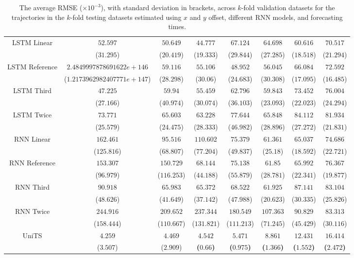 \begin{table}[!ht]
{\begin{tabular}{|c|c|c|c|c|c|c|c|}
			\multirow{2}{*}{LSTM Linear} & $52.597$ & $50.649$ & $44.777$ & $67.124$ & $64.698$ & $60.616$ & $70.517$ \\
			 & ($31.295$) & ($20.419$) & ($19.333$) & ($29.844$) & ($27.285$) & ($18.518$) & ($21.294$) \\ \hline
			\multirow{2}{*}{LSTM Reference} & $2.4849997878691622e+146$ & $59.116$ & $55.106$ & $48.952$ & $56.045$ & $66.084$ & $72.592$ \\
			 & ($1.2173962982407771e+147$) & ($28.298$) & ($30.06$) & ($24.683$) & ($30.308$) & ($17.095$) & ($16.485$) \\ \hline
			\multirow{2}{*}{LSTM Third} & $47.225$ & $59.94$ & $55.459$ & $62.796$ & $59.843$ & $73.452$ & $76.004$ \\
			 & ($27.166$) & ($40.974$) & ($30.074$) & ($36.103$) & ($23.093$) & ($22.023$) & ($24.294$) \\ \hline
			\multirow{2}{*}{LSTM Twice} & $73.771$ & $65.603$ & $63.228$ & $77.644$ & $65.848$ & $84.112$ & $81.934$ \\
			 & ($25.579$) & ($24.475$) & ($28.333$) & ($46.982$) & ($28.896$) & ($27.272$) & ($21.831$) \\ \hline
			\multirow{2}{*}{RNN Linear} & $162.461$ & $95.516$ & $110.602$ & $75.379$ & $61.361$ & $65.037$ & $74.686$ \\
			 & ($125.816$) & ($68.807$) & ($77.204$) & ($49.837$) & ($25.18$) & ($18.592$) & ($22.721$) \\ \hline
			\multirow{2}{*}{RNN Reference} & $153.307$ & $150.729$ & $68.144$ & $75.138$ & $61.85$ & $65.992$ & $76.367$ \\
			 & ($96.979$) & ($116.253$) & ($44.188$) & ($55.879$) & ($28.781$) & ($22.341$) & ($19.877$) \\ \hline
			\multirow{2}{*}{RNN Third} & $90.918$ & $65.983$ & $65.372$ & $68.522$ & $61.925$ & $87.141$ & $83.104$ \\
			 & ($48.626$) & ($41.649$) & ($37.142$) & ($47.988$) & ($20.623$) & ($30.335$) & ($25.826$) \\ \hline
			\multirow{2}{*}{RNN Twice} & $244.916$ & $209.652$ & $237.344$ & $180.549$ & $107.363$ & $90.829$ & $83.313$ \\
			 & ($158.444$) & ($110.667$) & ($131.821$) & ($111.213$) & ($71.245$) & ($45.429$) & ($30.116$) \\ \hline
			\multirow{2}{*}{UniTS} & $4.259$ & $4.469$ & $\mathbf{4.542}$ & $\mathbf{5.471}$ & $\mathbf{8.861}$ & $\mathbf{12.431}$ & $\mathbf{16.414}$ \\
			 & ($3.507$) & ($2.909$) & \textbf{(}$\mathbf{0.66}$\textbf{)} & \textbf{(}$\mathbf{0.975}$\textbf{)} & \textbf{(}$\mathbf{1.366}$\textbf{)} & \textbf{(}$\mathbf{1.552}$\textbf{)} & \textbf{(}$\mathbf{2.472}$\textbf{)} \\ \hline
		\end{tabular}
	}
	\caption{The average RMSE ($\times 10^{-3}$), with standard deviation in brackets, across $k$-fold validation datasets for the trajectories in the $k$-fold testing datasets estimated using $x$ and $y$ offset, different RNN models, and forecasting times.}
	\label{tab:all_no_abs_RMSE}
\end{table}